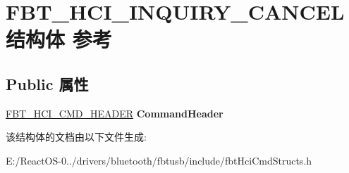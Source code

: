 \hypertarget{struct_f_b_t___h_c_i___i_n_q_u_i_r_y___c_a_n_c_e_l}{}\section{F\+B\+T\+\_\+\+H\+C\+I\+\_\+\+I\+N\+Q\+U\+I\+R\+Y\+\_\+\+C\+A\+N\+C\+E\+L结构体 参考}
\label{struct_f_b_t___h_c_i___i_n_q_u_i_r_y___c_a_n_c_e_l}
\subsection*{Public 属性}
\begin{DoxyCompactItemize}
\item 
\mbox{\label{struct_f_b_t___h_c_i___i_n_q_u_i_r_y___c_a_n_c_e_l_a15efcc2fdb0f088ffbf5483414fa349c}} 
\hyperlink{struct_f_b_t___h_c_i___c_m_d___h_e_a_d_e_r}{F\+B\+T\+\_\+\+H\+C\+I\+\_\+\+C\+M\+D\+\_\+\+H\+E\+A\+D\+ER} {\bfseries Command\+Header}
\end{DoxyCompactItemize}


该结构体的文档由以下文件生成\+:\begin{DoxyCompactItemize}
\item 
E\+:/\+React\+O\+S-\/0../drivers/bluetooth/fbtusb/include/fbt\+Hci\+Cmd\+Structs.\+h\end{DoxyCompactItemize}
